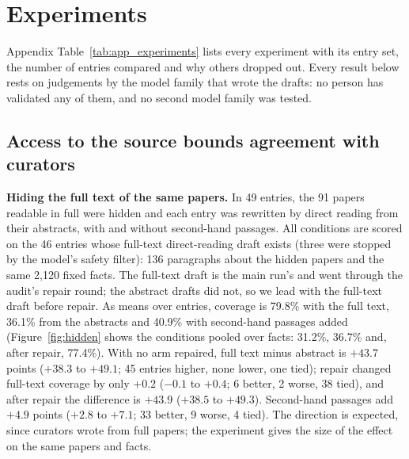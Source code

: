 \documentclass{article} %
\begin{document}
\section{Experiments}
\label{sec:experiments}
Appendix Table~\ref{tab:app_experiments} lists every experiment with its entry set, the number of entries compared and why others dropped out. Every result below rests on judgements by the model family that wrote the drafts: no person has validated any of them, and no second model family was tested.

\subsection{Access to the source bounds agreement with curators}
\label{sec:access}
\textbf{Hiding the full text of the same papers.} In 49 entries, the 91 papers readable in full were hidden and each entry was rewritten by direct reading from their abstracts, with and without second-hand passages. All conditions are scored on the 46 entries whose full-text direct-reading draft exists (three were stopped by the model's safety filter): 136 paragraphs about the hidden papers and the same 2,120 fixed facts. The full-text draft is the main run's and went through the audit's repair round; the abstract drafts did not, so we lead with the full-text draft before repair. As means over entries, coverage is 79.8\% with the full text, 36.1\% from the abstracts and 40.9\% with second-hand passages added (Figure~\ref{fig:hidden} shows the conditions pooled over facts: 31.2\%, 36.7\% and, after repair, 77.4\%). With no arm repaired, full text minus abstract is $+43.7$ points ($+38.3$ to $+49.1$; 45 entries higher, none lower, one tied); repair changed full-text coverage by only $+0.2$ ($-0.1$ to $+0.4$; 6 better, 2 worse, 38 tied), and after repair the difference is $+43.9$ ($+38.5$ to $+49.3$). Second-hand passages add $+4.9$ points ($+2.8$ to $+7.1$; 33 better, 9 worse, 4 tied). The direction is expected, since curators wrote from full papers; the experiment gives the size of the effect on the same papers and facts.
\end{document}
